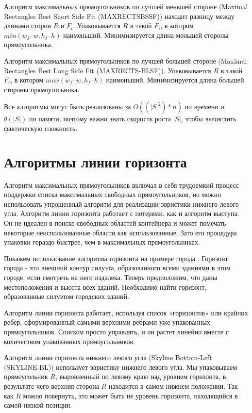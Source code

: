 \documentclass[a4paper,12pt]{report}
\begin{document}
Алгоритм максимальных прямоугольников по лучшей меньшей стороне (Maximal Rectangles Best Short Side Fit (MAXRECTSBSSF)) находит разницу между длинами сторон $R$ и $F_i$. Упаковывается $R$ в такой $F_i$, в котором $min(w_f – w, h_f – h)$ наименьший. Минимизируется длина меньшей стороны прямоугольника.

Алгоритм максимальных прямоугольников по лучшей большей стороне (Maximal Rectangles Best Long Side Fit (MAXRECTS-BLSF)). Упаковывается $R$ в такой $F_i$, в котором $max(w_f – w, h_f – h)$ наименьший. Минимизируется длина большей стороны прямоугольника.

Все алгоритмы могут быть реализованы за $O((|S|^2)*n)$ по времени и $\theta(|S|)$ по памяти, поэтому важно знать скорость роста $|S|$, чтобы вычислить фактическую сложность.

\section{Алгоритмы линии горизонта}

Алгоритм максимальных прямоугольников включал в себя трудоемкий процесс поддержки списка максимальных свободных прямоугольников, но можно использовать упрощенный алгоритм для реализации эвристики нижнего левого угла. Алгоритм линии горизонта работает с потерями, как и алгоритм выступа. Он не идеален в поиске свободных областей контейнера и может помечать некоторые неиспользованные области как использованные. Зато его процедура упаковки гораздо быстрее, чем в максимальных прямоугольниках.

Покажем использование алгоритма горизонта на примере города \citep{skyline}. Горизонт города - это внешний контур силуэта, образованного всеми зданиями в этом городе, если смотреть на него издалека. Теперь предположим, что даны местоположения и высота всех зданий. Необходимо найти горизонт, образованные силуэтом городских зданий.

Алгоритм линии горизонта работает, используя список «горизонтов» или крайних ребер, сформированный самыми верхними ребрами уже упакованных прямоугольников. Списком просто управлять, и он растет линейно вместе с количеством упакованных прямоугольников.

Алгоритм линии горизонта нижнего левого угла (Skyline Bottom-Left (SKYLINE-BL)) использует эвристику нижнего левого угла. Мы упаковываем прямоугольник $R$, выровненный по левому краю над уровнем горизонта, в результате чего верхняя сторона $R$ находится в самом нижнем положении. Так как $R$ можно повернуть, это может быть не уровень горизонта, находящийся в самой низкой позиции.
\end{document}
